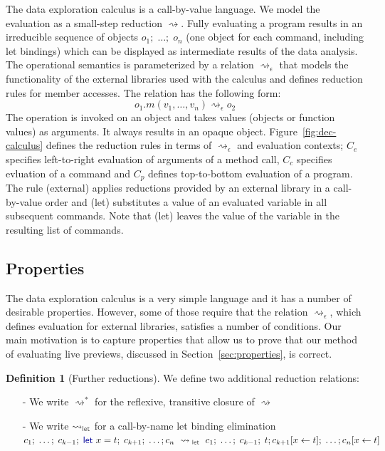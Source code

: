 \documentclass[acmsmall,anonymous,fleqn]{acmart}\settopmatter{printfolios=false,printccs=false,printacmref=false}
\newcounter{dfc}
\theoremstyle{plain}
\theoremstyle{definition}
\newtheorem{definition}[dfc]{Definition}
\newcommand{\ident}[1]{\textnormal{\textcolor{idclr}{\sffamily #1}}}
\newcommand{\kvd}[1]{\textnormal{\textcolor{kvdclr}{\sffamily #1}}}
\newcommand{\rname}[1]{{\sffamily\small(#1)}}
\begin{document}
The data exploration calculus is a call-by-value language. We model the evaluation as a small-step
reduction $\rightsquigarrow$. Fully evaluating a program results in an irreducible sequence of
objects $o_1;\; \ldots;\; o_n$ (one object for each command, including let bindings) which can be
displayed as intermediate results of the data analysis. The operational semantics is parameterized
by a relation $\rightsquigarrow_\epsilon$ that models the functionality of the external libraries
used with the calculus and defines reduction rules for member accesses. The relation has the
following form:
%
\begin{equation*}
o_1.m(v_1, \ldots, v_n) \rightsquigarrow_\epsilon o_2
\end{equation*}
%
The operation is invoked on an object and takes values (objects or function values) as arguments.
It always results in an opaque object.
Figure~\ref{fig:dec-calculus} defines the reduction rules in terms of $\rightsquigarrow_\epsilon$
and evaluation contexts; $C_e$ specifies left-to-right evaluation of arguments of a method call,
$C_c$ specifies evluation of a command and $C_p$ defines top-to-bottom evaluation of a program.
The rule \rname{external} applies reductions provided by an external library in a
call-by-value order and \rname{let} substitutes a value of an evaluated variable in
all subsequent commands. Note that \rname{let} leaves the value of the variable
in the resulting list of commands.

\subsection{Properties}
The data exploration calculus is a very simple language and it has a number of desirable
properties. However, some of those require that the relation $\rightsquigarrow_\epsilon$, which
defines evaluation for external libraries, satisfies a number of conditions. Our main motivation
is to capture properties that allow us to prove that our method of evaluating live previews,
discussed in Section~\ref{sec:properties}, is correct.

\begin{definition}[Further reductions]
\label{def:further-red}
We define two additional reduction relations:
\begin{itemize}
\item[-] We write $\rightsquigarrow^{*}$ for the reflexive, transitive closure of $\rightsquigarrow$
\item[-] We write $\rightsquigarrow_\ident{let}$ for a call-by-name let binding elimination\\
  $c_1;\; \ldots;\; c_{k-1};\; \kvd{let}~x=t;\; c_{k+1};\; \ldots; c_n ~\rightsquigarrow_\ident{let}~
  c_1;\; \ldots;\; c_{k-1};\; t; c_{k+1}[x\leftarrow t];\; \ldots; c_n[x\leftarrow t]$
\end{itemize}
\end{definition}
\end{document}
